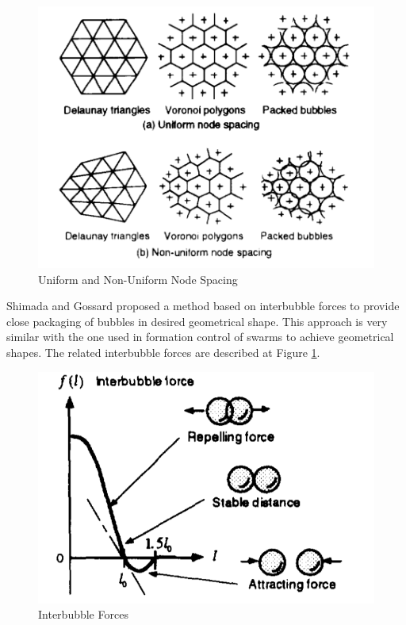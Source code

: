 \begin{figure}[H]
	\caption{Uniform and Non-Uniform Node Spacing \cite{27}}
	\centering
	\includegraphics[scale = 0.35]{nodespacing}
\end{figure}

Shimada and Gossard proposed a method based on interbubble forces to provide close packaging of bubbles in desired geometrical shape. This approach is very similar with the one used in formation control of swarms to achieve geometrical shapes. The related interbubble forces are described at Figure \ref{interbubble_ref}.

\begin{figure}[H]
	\caption{Interbubble Forces \cite{27}} \label{interbubble_ref}
	\centering
	\includegraphics[scale = 0.3]{interbubble}
\end{figure}


